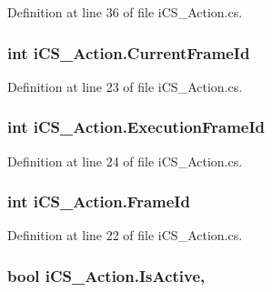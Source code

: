 Definition at line 36 of file i\+C\+S\+\_\+\+Action.\+cs.

\hypertarget{classi_c_s___action_a97659af385187584ff04da8b5f6ecbac}{
\subsubsection[{Current\+Frame\+Id}]{\setlength{\rightskip}{0pt plus 5cm}int i\+C\+S\+\_\+\+Action.\+Current\+Frame\+Id\hspace{0.3cm}{\ttfamily [get]}}}\label{classi_c_s___action_a97659af385187584ff04da8b5f6ecbac}


Definition at line 23 of file i\+C\+S\+\_\+\+Action.\+cs.

\hypertarget{classi_c_s___action_aa2ca65dac75b45974698e8f50b706457}{
\subsubsection[{Execution\+Frame\+Id}]{\setlength{\rightskip}{0pt plus 5cm}int i\+C\+S\+\_\+\+Action.\+Execution\+Frame\+Id\hspace{0.3cm}{\ttfamily [get]}}}\label{classi_c_s___action_aa2ca65dac75b45974698e8f50b706457}


Definition at line 24 of file i\+C\+S\+\_\+\+Action.\+cs.

\hypertarget{classi_c_s___action_aa290a19c510c8b2eced2c7e00d204647}{
\subsubsection[{Frame\+Id}]{\setlength{\rightskip}{0pt plus 5cm}int i\+C\+S\+\_\+\+Action.\+Frame\+Id\hspace{0.3cm}{\ttfamily [get]}}}\label{classi_c_s___action_aa290a19c510c8b2eced2c7e00d204647}


Definition at line 22 of file i\+C\+S\+\_\+\+Action.\+cs.

\hypertarget{classi_c_s___action_ab5b67f53c94c5c6905769a05d93a80fe}{
\subsubsection[{Is\+Active}]{\setlength{\rightskip}{0pt plus 5cm}bool i\+C\+S\+\_\+\+Action.\+Is\+Active\hspace{0.3cm}{\ttfamily [get]}, {\ttfamily [set]}}}\label{classi_c_s___action_ab5b67f53c94c5c6905769a05d93a80fe}



